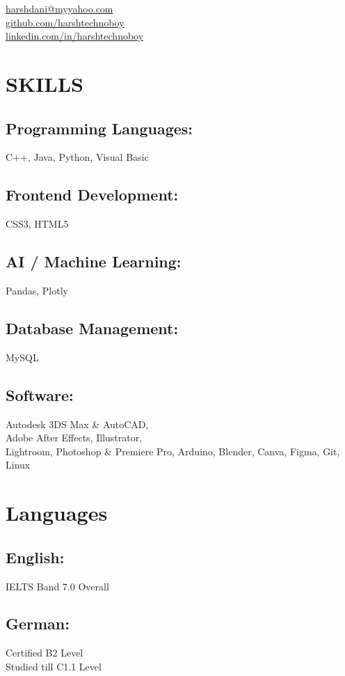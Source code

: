 \documentclass[]{resume}
\begin{document}
{
	\faEnvelope \href{mailto:harshdani@myyahoo.com}{harshdani@myyahoo.com}\\
	\faGithub \href{https://github.com/harshtechnoboy}{github.com/harshtechnoboy}\\
	\faLinkedinSquare \href{https://www.linkedin.com/in/harshtechnoboy}{linkedin.com/in/harshtechnoboy}
}
\begin{minipage}[t]{0.34\textwidth} 
\section{SKILLS} 
\subsection{Programming Languages:}
C++, Java, Python, Visual Basic \\
\subsection{Frontend Development:}
CSS3, HTML5 \\
\subsection{AI / Machine Learning:}
Pandas, Plotly \\
\subsection{Database Management:}
MySQL \\
\subsection{Software:}
Autodesk 3DS Max \& AutoCAD, \\Adobe After Effects, Illustrator,\\ Lightroom, Photoshop \& Premiere Pro, Arduino, Blender, Canva, Figma, Git, Linux  \\
\section{Languages}
\subsection{English:}
IELTS Band 7.0 Overall \\
\subsection{German:}
Certified B2 Level \\
Studied till C1.1 Level
\sectionsep

\end{minipage}
\end{document}
